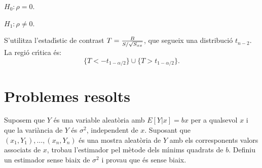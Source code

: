 \begin{description}
\item $H_0: \rho = 0$.
\item $H_1: \rho \not = 0$.
\end{description}

S'utilitza l'estad\'{\i}stic de contrast 
$T = {B \over S/\sqrt{S_{xx}}}$, que segueix
una distribuci\'o $t_{n-2}$. La regi\'o cr\'{\i}tica \'es:
$$\{ T < - t_{1-\alpha/2} \} \cup \{ T > t_{1-\alpha/2} \}.$$

\section{Problemes resolts}

\begin{probres}
{Suposem que $Y$ \'es una variable aleat\`oria amb $E[Y|x]=bx$ per a qualsevol
$x$ i que la vari\`ancia de $Y$ \'es $\sigma^2$, independent de $x$. Suposant
que \mbox{$(x_1,Y_1),\ldots,(x_n,Y_n)$} \'es una mostra aleat\`oria de $Y$
amb els corresponents valors associats de $x$, trobau l'estimador pel
m\`etode dels m\'{\i}nims quadrats de $b$. Definiu un estimador sense
biaix de $\sigma^2$ i provau que \'es sense biaix.}
\end{probres}

